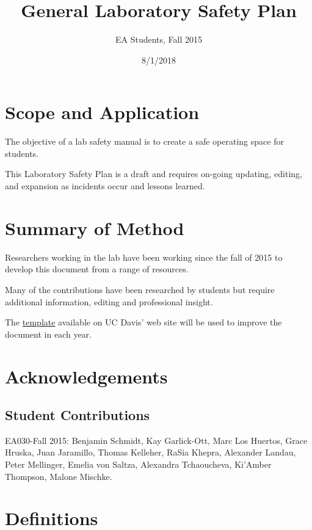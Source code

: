 \documentclass[12pt]{../SOP4_alpha}\usepackage[]{graphicx}\usepackage[]{xcolor}
\title{General Laboratory Safety Plan}
\date{8/1/2018}
\author{EA Students, Fall 2015}
\begin{document}
\maketitle


\section{Scope and Application}

\NP The objective of a lab safety manual is to create a safe operating space for students.

\NP This Laboratory Safety Plan is a draft and requires on-going updating, editing, and expansion as incidents occur and lessons learned. 


\section{Summary of Method}

\NP Researchers working in the lab have been working since the fall of 2015 to develop this document from a range of resources. 

\NP Many of the contributions have been researched by students but require additional information, editing and professional insight.

\NP The \href{http://safetyservices.ucdavis.edu/sites/default/files/documents/LabSafetyPlan_Template.docx}{template} available on UC Davis' web site will be used to improve the document in each year.

\newpage
\tableofcontents

\section{Acknowledgements}

\subsection*{Student Contributions}

\NP EA030-Fall 2015: Benjamin Schmidt, Kay Garlick-Ott, Marc Los Huertos, Grace Hruska, Juan Jaramillo, Thomas Kelleher, RaSia Khepra, Alexander Landau, Peter Mellinger, Emelia von Saltza, Alexandra Tchaoucheva, Ki'Amber Thompson, Malone Mischke.


\section{Definitions}
\end{document}
